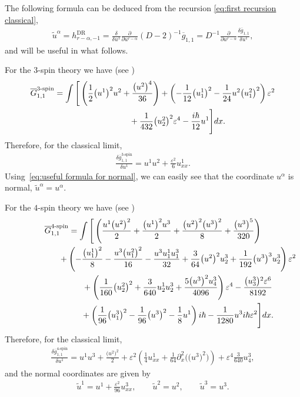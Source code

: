 \documentclass[pdftex]{sigma}
\numberwithin{equation}{section}
\newcommand{\tu}{{\widetilde u}}
\newcommand{\og}{\overline g}
\def\d{{\partial}}
\newcommand{\<}{\left<}
\renewcommand{\>}{\right>}
\newcommand{\eps}{\varepsilon}
\newcommand{\DR}{\mathrm{DR}}
\newcommand{\oG}{{\overline G}}
\begin{document}
The following formula can be deduced from the recursion \ref{eq:first recursion classical},
\begin{gather}\label{eq:useful formula for normal}
\tu^\alpha=h^\DR_{r-\alpha,-1}=\frac{\delta}{\delta u^1}\frac{\d}{\d u^{r-\alpha}}(D-2)^{-1}\og_{1,1}=D^{-1}\frac{\d}{\d u^{r-\alpha}}\frac{\delta\og_{1,1}}{\delta u^1},
\end{gather}
and will be useful in what follows.

For the $3$-spin theory we have (see \cite{BDGR16b})
\begin{gather*}
\oG_{1,1}^{3\text{-spin}} = \int\Bigg[\left(\frac{1}{2} \big(u^1\big)^2 u^2+\frac{\big(u^2\big)^4}{36}\right)+\left(-\frac{1}{12} \big(u_1^1\big)^2-\frac{1}{24} u^2 \big(u_1^2\big)^2\right) \eps ^2\\
\hphantom{\oG_{1,1}^{3\text{-spin}} = \int\Bigg[}{} +\frac{1}{432} \big(u_2^2\big)^2 \eps ^4 - \frac{i\hbar}{12} u^1\Bigg] dx.
\end{gather*}
Therefore, for the classical limit,
\begin{gather*}
\frac{\delta\og^{3\text{-spin}}_{1,1}}{\delta u^1}=u^1u^2+\frac{\eps^2}{6}u^1_{xx}.
\end{gather*}
Using~\eqref{eq:useful formula for normal}, we can easily see that the coordinate $u^\alpha$ is normal, $\tu^\alpha=u^\alpha$.

For the $4$-spin theory we have (see \cite{BDGR16b})
\begin{gather*}
\oG_{1,1}^{4\text{-spin}} =\int \Bigg[\left(\frac{ u^1 \big(u^2\big)^2}{2}+\frac{\big(u^1\big)^2 u^3}{2} +\frac{\big(u^2\big)^2 \big(u^3\big)^2}{8} +\frac{\big(u^3\big)^5}{320}\right) \\
\hphantom{\oG_{1,1}^{4\text{-spin}} =\int \Bigg[}{} +\left(-\frac{\big(u_1^1\big)^2}{8} -\frac{u^3
 \big(u_1^2\big)^2}{16} -\frac{u^3 u_1^1 u_1^3}{32} +\frac{3}{64} \big(u^2\big)^2 u_2^3+\frac{1}{192} \big(u^3\big)^3 u_2^3\right) \eps ^2 \\
\hphantom{\oG_{1,1}^{4\text{-spin}} =\int \Bigg[}{} +\left(\frac{1}{160} \big(u_2^2\big)^2+\frac{3}{640} u_2^1
 u_2^3+\frac{5 \big(u^3\big)^2 u_4^3}{4096}\right) \eps ^4-\frac{\big(u_3^3\big){}^2 \eps ^6}{8192} \\
 \hphantom{\oG_{1,1}^{4\text{-spin}} =\int \Bigg[}{} +\left( \frac{1}{96} \big(u^3_1\big)^2 - \frac{1}{96} \big(u^3\big)^2 -\frac{1}{8} u^1 \right)i\hbar - \frac{1}{1280} u^3 i\hbar \eps^2 \Bigg]dx.
\end{gather*}
Therefore, for the classical limit,
\begin{gather*}
\frac{\delta\og^{4\text{-spin}}_{1,1}}{\delta u^1}=u^1u^3+\frac{\big(u^2\big)^2}{2}+\eps^2\left(\frac{1}{4}u^1_{xx}+\frac{1}{64}\d_x^2\big(\big(u^3\big)^2\big)\right)+\eps^4\frac{3}{640}u^3_4,
\end{gather*}
and the normal coordinates are given by
\begin{gather*}
\tu^1=u^1+\frac{\eps^2}{96}u^3_{xx},\qquad \tu^2=u^2,\qquad \tu^3=u^3.
\end{gather*}
\end{document}
